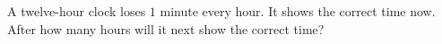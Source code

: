 A twelve-hour clock loses $1$ minute every hour. It shows the correct time now. After how many hours will it next show the correct time?
